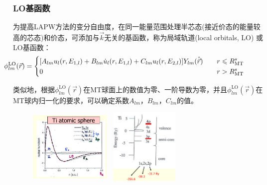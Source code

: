 \documentclass[cjk,slidestop,compress,mathserif,blue]{beamer}
\begin{document}
{
\frametitle{\textrm{LO}基函数}
为提高\textrm{LAPW}方法的变分自由度，在同一能量范围处理半芯态(接近价态的能量较高的芯态)和价态，可添加与$\vec k$无关的基函数，称为局域轨道(\textrm{local orbitals, LO})%
或\textrm{LO}基函数：
{\footnotesize
$$\hskip -40pt \phi_{lm}^{\mathrm{LO}}(\vec r)=\left\{
  \begin{aligned}
    &[A_{lm}u_l(r,E_{1,l})+B_{lm}\dot u_l(r,E_{1,l})+C_{lm}u_l(r,E_{2,l})]Y_{lm}(\hat{\vec r})\quad&r\leqslant R_{\mathrm{MT}}^s\\
    &0 &r>R_{\mathrm{MT}}^s
\end{aligned}
\right.$$}

类似地，根据$\phi_{lm}^{\mathrm{LO}}(\vec r)$在\textrm{MT}球面上的数值为零、一阶导数为零，并且$\phi_{lm}^{\mathrm{LO}}(\vec r)$在\textrm{MT}球内归一化的要求，可以确定系数$A_{lm}$，$B_{lm}$，$C_{lm}$的值。
\begin{figure}[h!]
	\vspace{-15pt}
\centering
\hspace{15pt}
\includegraphics[height=1.45in,width=1.55in,viewport=50 10 470 415,clip]{Figures/WIEN2k-lo.png}
\includegraphics[height=1.45in,width=1.45in,viewport=5 1 570 570,clip]{Figures/semi-core.png}
\caption{\small \textrm{}}%
\label{Muffin_tin_LO}
\end{figure}
}
\end{document}

